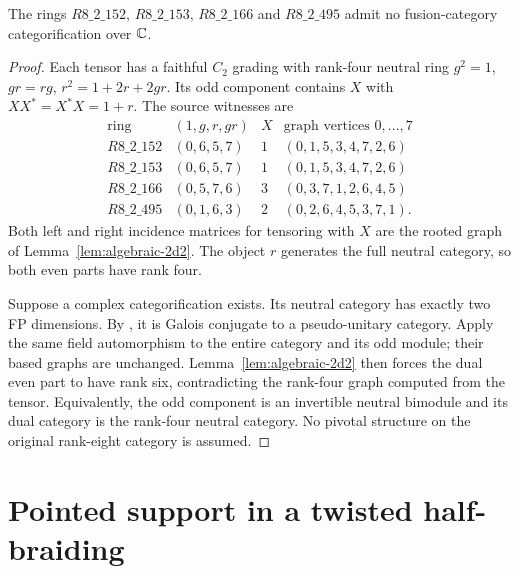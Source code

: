 \begin{proposition}\label{prop:2d2-four-general}
The rings $R8\_2\_152$, $R8\_2\_153$, $R8\_2\_166$ and
$R8\_2\_495$ admit no fusion-category categorification over $\mathbb C$.
\end{proposition}
\begin{proof}
Each tensor has a faithful $C_2$ grading with rank-four neutral
ring $g^2=1$, $gr=rg$, $r^2=1+2r+2gr$. Its odd component
contains $X$ with $XX^*=X^*X=1+r$. The source witnesses are
\[
\begin{array}{c|c|c|c}
\text{ring}&(1,g,r,gr)&X&
\text{graph vertices }0,\ldots,7\\\hline
R8\_2\_152&(0,6,5,7)&1&(0,1,5,3,4,7,2,6)\\
R8\_2\_153&(0,6,5,7)&1&(0,1,5,3,4,7,2,6)\\
R8\_2\_166&(0,5,7,6)&3&(0,3,7,1,2,6,4,5)\\
R8\_2\_495&(0,1,6,3)&2&(0,2,6,4,5,3,7,1).
\end{array}
\]
Both left and right incidence matrices for tensoring with $X$
are the rooted graph of Lemma~\ref{lem:algebraic-2d2}. The object
$r$ generates the full neutral category, so both even parts
have rank four.

Suppose a complex categorification exists. Its neutral category
has exactly two FP dimensions. By \cite[Lemma~3.1]{SchNear},
it is Galois conjugate to a pseudo-unitary category. Apply the
same field automorphism to the entire category and its odd
module; their based graphs are unchanged. Lemma~\ref{lem:algebraic-2d2}
then forces the dual even part to have rank six, contradicting
the rank-four graph computed from the tensor. Equivalently,
the odd component is an invertible neutral bimodule and its
dual category is the rank-four neutral category. No pivotal
structure on the original rank-eight category is assumed.
\end{proof}

\section{Pointed support in a twisted half-braiding}
\label{sec:twisted-pointed-support}

